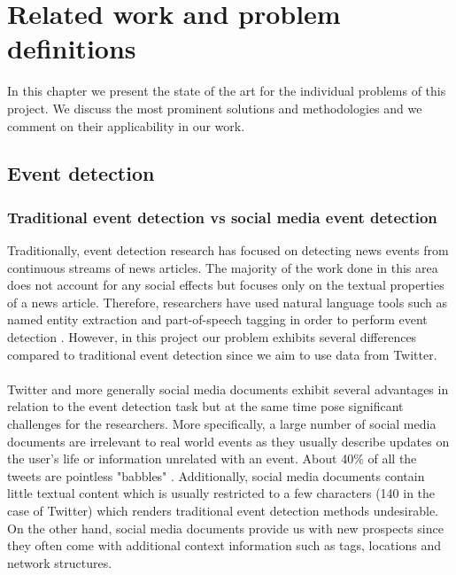 
\chapter{Related work and problem definitions}\label{RelatedWork}
\ifpdf
    \graphicspath{{Chapter1/Chapter1Figs/PNG/}{Chapter1/Chapter1Figs/PDF/}{Chapter1/Chapter1Figs/}}
\else
    \graphicspath{{Chapter1/Chapter1Figs/EPS/}{Chapter1/Chapter1Figs/}}
\fi
In this chapter we present the state of the art for the individual problems of this project. We discuss the most
prominent solutions and methodologies and we comment on their applicability in our work.
\section{Event detection }\label{sec:EventDetectionBack}
\subsection{Traditional event detection vs social media event detection}\label{sec:DifferencesBetweentraditional}

Traditionally, event detection research has focused on detecting news events from continuous streams of news articles. The majority of the work done in this area does not account for any social effects but focuses only on the textual properties of a news article. Therefore, researchers have used natural language tools such as named entity extraction and part-of-speech tagging in order to perform event detection \cite{Becker_eventidentification}. However, in this project our problem exhibits several differences compared to traditional event detection since we aim to use data from Twitter.\\\\
Twitter and more generally social media documents exhibit several advantages in relation to the event detection task but at the same time pose significant challenges for the researchers. More specifically, a large number of social media documents are irrelevant to real world events as they usually describe updates on the user's life or information unrelated with an event. About 40\% of all the tweets are pointless "babbles" \cite{conf/icwsm/WengL11}. Additionally, social media documents contain little textual content which is usually restricted to a few characters (140 in the case of Twitter) which renders traditional event detection methods undesirable. On the other hand, social media documents provide us with new prospects since they often come with additional context information such as tags, locations and network structures.
	

